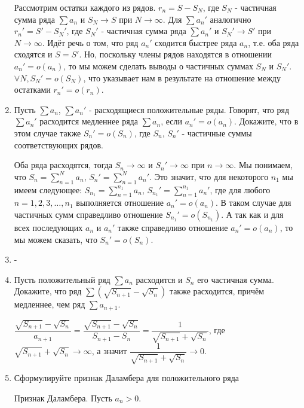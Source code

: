 \documentclass[a4paper]{article}
\begin{document}
\begin{enumerate}
        Рассмотрим остатки каждого из рядов. $r_n = S - S_N$, где $S_N$ - частичная сумма ряда $\sum a_n$ и $S_N \rightarrow S$ при $N \rightarrow \infty$. Для $\sum a_n'$ аналогично $r_n' = S' - S_N'$, где $S_N'$ - частичная сумма ряда $\sum a_n'$ и $S_N' \rightarrow S'$ при $N \rightarrow \infty$. Идёт речь о том, что ряд $a_n'$ сходится быстрее ряда $a_n$, т.е. оба ряда сходятся и $S = S'$. Но, поскольку члены рядов находятся в отношении $a_n' = o(a_n)$, то мы можем сделать выводы о частичных суммах $S_N$ и $S_N'$. $\forall N, S_N' = o(S_N)$, что указывает нам в результате на отношение между остатками $r_n' = o(r_n)$.
        \item Пусть $\sum a_n$, $\sum a_n'$ - расходящиеся положительные ряды. Говорят, что ряд $\sum a_n'$ расходится медленнее ряда $\sum a_n$, если $a_n' = o(a_n)$. Докажите, что в этом случае также $S_n' = o(S_n)$, где $S_n$, $S_n'$ - частичные суммы соответствующих рядов.
        
        Оба ряда расходятся, тогда $S_n \rightarrow \infty$ и $S_n' \rightarrow \infty$ при $n \rightarrow \infty$. Мы понимаем, что $S_n = \sum_{n = 1}^{N} a_n$, $S_n' = \sum_{n = 1}^{N} a_n'$. Это значит, что для некоторого $n_1$ мы имеем следующее: $S_{n_1} = \sum_{n = 1}^{n_1} a_n$, $S_{n_1}' = \sum_{n = 1}^{n_1} a_n'$, где для любого $n = 1, 2, 3, \dots, n_1$ выполняется отношение $a_n' = o(a_n)$. В таком случае для частичных сумм справедливо отношение $S_{n_1}' = o(S_{n_1})$. А так как и для всех последующих $a_n$ и $a_n'$ также справедливо отношение $a_n' = o(a_n)$, то мы можем сказать, что $S_n' = o(S_n)$.
        \item -
        
        \item Пусть положительный ряд $\sum a_n$ расходится и $S_n$ его частичная сумма. Докажите, что ряд $\sum (\sqrt{S_{n+1}} - \sqrt{S_n})$ также расходится, причём медленнее, чем ряд $\sum a_{n+1}$.
        
        $\dfrac{\sqrt{S_{n+1}} - \sqrt{S_n}}{a_{n+1}} = \dfrac{\sqrt{S_{n+1}} - \sqrt{S_n}}{S_{n+1} - S_n} = \dfrac{1}{\sqrt{S_{n+1}} + \sqrt{S_n}}$, где $\sqrt{S_{n+1}} + \sqrt{S_n} \rightarrow \infty$, а значит $\dfrac{1}{\sqrt{S_{n+1}} + \sqrt{S_n}} \rightarrow 0$.
        
        \item Сформулируйте признак Даламбера для положительного ряда
        \begin{theorem}
            Признак Даламбера. Пусть $a_n > 0$.
            

\end{theorem}
\end{enumerate}
\end{document}

